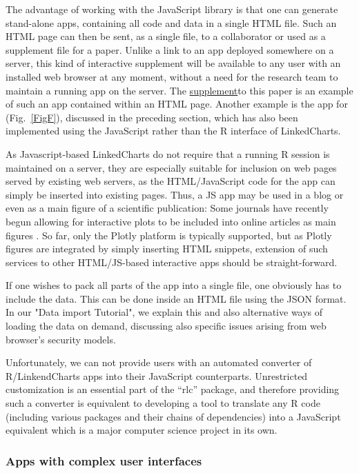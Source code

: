 \documentclass[twocolumn,10pt]{article}
\newcommand{\supplement}{\href{https://anders-biostat.github.io/lc-paper/}{supplement}}
\begin{document}
The advantage of working with the JavaScript library is that one can generate stand-alone apps, containing all code and data in a single HTML file. Such an HTML page can then be sent, as a single file, to a collaborator or used as a supplement file for a paper. Unlike a link to an app deployed somewhere on a server, this kind of interactive supplement will be available to any user with an installed web browser at any moment, without a need for the research team to maintain a running app on the server. The \supplement to this paper is an example of such an app contained within an HTML page. Another example is the app for \citet{wang_2020} (Fig.\ \ref{FigF}), discussed in the preceding section, which has also been implemented using the JavaScript rather than the R interface of LinkedCharts. 

As Javascript-based LinkedCharts do not require that a running R session is maintained on a server, they are especially suitable for inclusion on web pages served by existing web servers, as the HTML/JavaScript code for the app can simply be inserted into existing pages. Thus, a JS app may be used in a blog or even as a main figure of a scientific publication: Some journals have recently begun allowing for interactive plots to be included into online articles as main figures \citep{ingraham_2017}. So far, only the Plotly platform is typically supported, but as Plotly figures are integrated by simply inserting HTML snippets, extension of such services to other HTML/JS-based interactive apps should be straight-forward.

If one wishes to pack all parts of the app into a single file, one obviously has to include the data. This can be done inside an HTML file using the JSON format. In our "Data import Tutorial", we explain this and also alternative ways of loading the data on demand, discussing also specific issues arising from web browser's security models.

Unfortunately, we can not provide users with an automated converter of R/LinkendCharts apps into their JavaScript counterparts. Unrestricted customization is an essential part of the ``rlc'' package, and therefore providing such a converter is equivalent to developing a tool to translate any R code (including various packages and their chains of dependencies) into a JavaScript equivalent which is a major computer science project in its own.

\subsubsection{Apps with complex user interfaces}\label{gui_apps}
\end{document}
